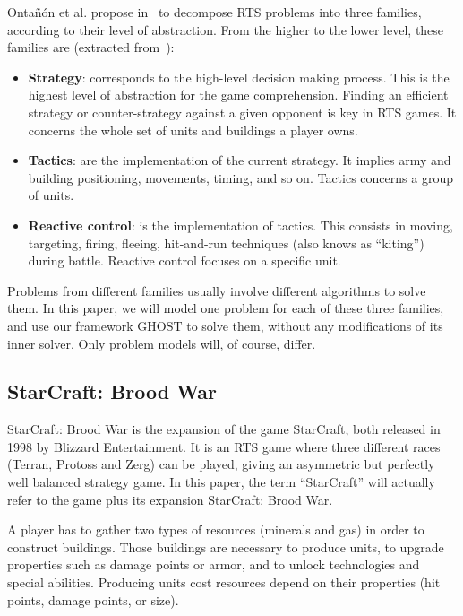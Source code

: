 \documentclass[journal]{IEEEtran}
\newcommand{\ghost}{\textsc{GHOST}\xspace}
\begin{document}
Onta{\~n}{\'o}n et  al. propose in~\cite{OntanonSURCM13}  to decompose
RTS  problems  into  three  families,  according  to  their  level  of
abstraction. From  the higher to  the lower level, these  families are
(extracted from~\cite{OntanonSURCM13}):
\begin{itemize}
\item {\bf  Strategy}: corresponds  to the high-level  decision making
  process.   This is  the highest  level of  abstraction for  the game
  comprehension.   Finding an  efficient strategy  or counter-strategy
  against a given opponent is key  in RTS games. It concerns the whole
  set of units and buildings a player owns.
\item {\bf Tactics}:  are the implementation of  the current strategy.
  It implies army and building  positioning, movements, timing, and so
  on. Tactics concerns a group of units.
\item {\bf Reactive  control}: is the implementation  of tactics. This
  consists   in  moving,   targeting,  firing,   fleeing,  hit-and-run
  techniques  (also  knows  as ``kiting'')  during  battle.   Reactive
  control focuses on a specific unit.
\end{itemize}
Problems from different families  usually involve different algorithms
to solve them.  In  this paper, we will model one  problem for each of
these three families,  and use our framework \ghost to  solve them, without
any modifications  of its inner  solver. Only  problem models  will, of
course, differ.

\subsection{StarCraft: Brood War}

StarCraft:  Brood War  is the  expansion of  the game  StarCraft, both
released in 1998  by Blizzard Entertainment.  It is an  RTS game where
three  different  races (Terran, Protoss and Zerg)  can be played,
giving an  asymmetric but perfectly  well balanced strategy  game.  In
this paper,  the term  ``StarCraft'' will actually  refer to  the game
plus its expansion StarCraft: Brood War.

A player  has to  gather two  types of resources (minerals and  gas) in
order   to  construct   buildings. Those buildings are necessary to produce  units, to  upgrade
properties such as damage points or armor, and to unlock technologies
and special abilities. Producing units cost resources depend on their properties (hit points, damage points, or size).
\end{document}

